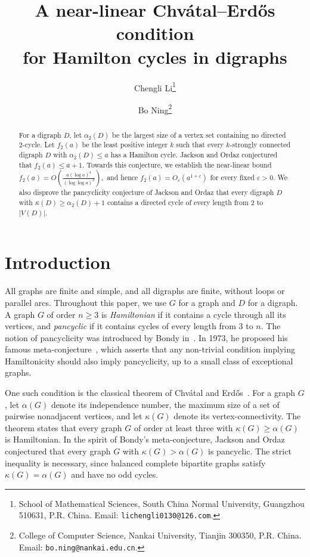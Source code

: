 \documentclass[11pt,a4paper]{article}
\title{A near-linear Chv\'atal--Erd\H{o}s condition\\
	for Hamilton cycles in digraphs}
\author{
	Chengli Li\thanks{School of Mathematical Sciences, South China Normal University,
	Guangzhou 510631, P.R. China. Email: \texttt{lichengli0130@126.com}.}
	\and
	Bo Ning\thanks{College of Computer Science, Nankai University,
		Tianjin 300350, P.R. China. Email: \texttt{bo.ning@nankai.edu.cn}.
}
}
\date{}
\theoremstyle{remark}
\numberwithin{equation}{section}
\begin{document}
	\maketitle
	\begin{abstract}
		For a digraph $D$, let $\alpha_2(D)$ be the largest size of a vertex set
		containing no directed $2$-cycle. Let $f_2(a)$ be the least positive integer
		$k$ such that every $k$-strongly connected digraph $D$ with
		$\alpha_2(D)\le a$ has a Hamilton cycle. Jackson and Ordaz conjectured that
		$f_2(a)\le a+1$. Towards this conjecture, we establish the near-linear bound
		$
		f_2(a)=O\!\left(\frac{a(\log a)^4}{(\log\log a)^2}\right),
		$
		and hence
		$f_2(a)=O_\varepsilon(a^{1+\varepsilon})$ for every fixed $\varepsilon>0$.
		We also disprove the pancyclicity conjecture of Jackson and Ordaz
		that every digraph $D$ with $\kappa(D)\ge\alpha_2(D)+1$ contains
		a directed cycle of every length from $2$ to $|V(D)|$.
	\end{abstract}
	
	\section{Introduction}	
All graphs are finite and simple, and all digraphs are finite, without loops or parallel arcs.
Throughout this paper, we use $G$ for a graph and $D$ for a digraph.
A graph $G$ of order $n\ge3$ is \emph{Hamiltonian} if it contains a cycle through all its vertices, and \emph{pancyclic} if it contains cycles of every length from $3$ to $n$.
The notion of pancyclicity was introduced by Bondy in~\cite{BondyP}. In 1973, he proposed his famous meta-conjecture~\cite{BondyMeta}, which asserts that any non-trivial condition implying Hamiltonicity should also imply pancyclicity, up to a small class of exceptional graphs.

One such condition is the classical theorem of Chv\'atal and Erd\H{o}s~\cite{CE}.
For a graph $G$, let $\alpha(G)$ denote its independence number, the maximum size of a set of pairwise nonadjacent vertices, and let $\kappa(G)$ denote its vertex-connectivity.
The theorem states that every graph $G$ of order at least three with $\kappa(G)\ge\alpha(G)$ is Hamiltonian.
In the spirit of Bondy's meta-conjecture, Jackson and Ordaz~\cite{JO} conjectured that every graph $G$ with $\kappa(G)>\alpha(G)$ is pancyclic.
The strict inequality is necessary, since balanced complete bipartite graphs satisfy $\kappa(G)=\alpha(G)$ and have no odd cycles.
\end{document}
